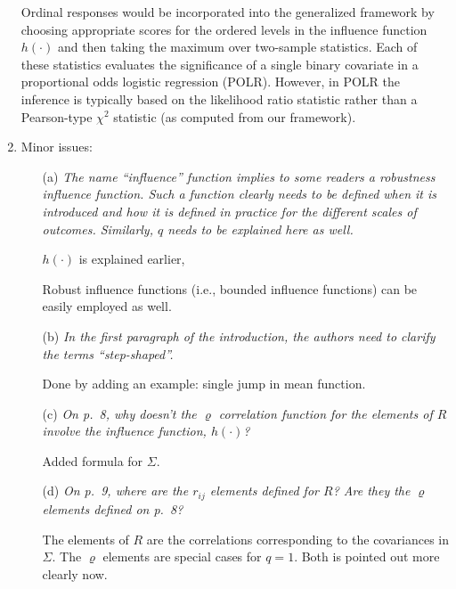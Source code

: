 \documentclass[11pt,a4paper]{article}
\begin{document}
\begin{enumerate}
	Ordinal responses would be incorporated into the generalized framework
	by choosing appropriate scores for the ordered levels in the influence
	function $h(\cdot)$ and then taking the maximum over two-sample statistics.
	Each of these statistics evaluates the significance of a single binary
	covariate in a proportional odds logistic regression (POLR). However, in
	POLR the inference is typically based on the likelihood ratio statistic
	rather than a Pearson-type $\chi^2$ statistic (as computed from our
	framework).
	
  \item Minor issues:
  
  \begin{itemize}
  
    \item[(a)] \textit{The name ``influence'' function implies to some readers a
               robustness influence function. Such a function clearly needs to be
	       defined when it is introduced and how it is defined in practice
	       for the different scales of outcomes. Similarly, $q$ needs to be
	       explained here as well.}
	       
	       $h(\cdot)$ is explained earlier, 
	       
	       Robust influence functions (i.e., bounded influence functions) can
	       be easily employed as well.
	       
    \item[(b)] \textit{In the first paragraph of the introduction, the authors need to
               clarify the terms ``step-shaped''.}
	       
	       Done by adding an example: single jump in mean function.
	       
    \item[(c)] \textit{On p.~8, why doesn't the $\varrho$ correlation function for the
               elements of $R$ involve the influence function, $h(\cdot)$?}
	       
	       Added formula for $\Sigma$.
	       
    \item[(d)] \textit{On p.~9, where are the $r_{ij}$ elements defined for $R$? Are
               they the $\varrho$ elements defined on p.~8?}
    
               The elements of $R$ are the correlations corresponding to the covariances
	       in $\Sigma$. The $\varrho$ elements are special cases for $q = 1$.
	       Both is pointed out more clearly now.


\end{itemize}
\end{enumerate}
\end{document}
